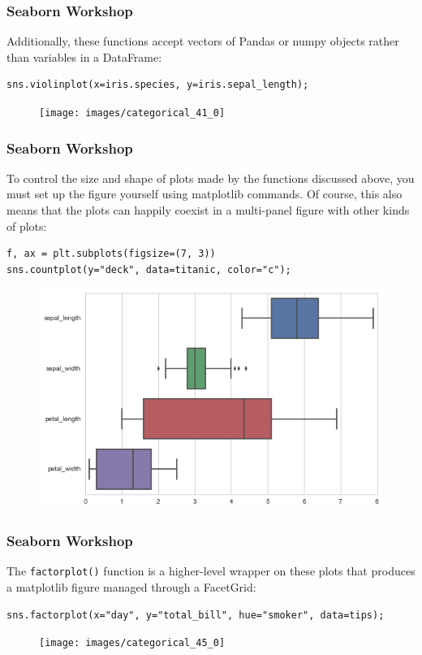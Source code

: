 \documentclass{beamer}
\begin{document}
\begin{frame}[fragile]
	\frametitle{Seaborn Workshop}
	\large
	
Additionally, these functions accept vectors of Pandas or numpy objects rather than variables in a DataFrame:
\begin{verbatim}
sns.violinplot(x=iris.species, y=iris.sepal_length);
\end{verbatim}

\begin{figure}
	\centering
	\texttt{[image: images/categorical\_41\_0]}

\end{figure}
\end{frame}
\begin{frame}[fragile]
	\frametitle{Seaborn Workshop}
	\large
	
To control the size and shape of plots made by the functions discussed above, you must set up the figure yourself using matplotlib commands. Of course, this also means that the plots can happily coexist in a multi-panel figure with other kinds of plots:
\begin{verbatim}
f, ax = plt.subplots(figsize=(7, 3))
sns.countplot(y="deck", data=titanic, color="c");
\end{verbatim}
\begin{figure}
	\centering
	\includegraphics[width=0.7\linewidth]{images/categorical_43_0}
	
\end{figure}
\end{frame}
\begin{frame}[fragile]
	\frametitle{Seaborn Workshop}
	\large
	
The \texttt{factorplot()} function is a higher-level wrapper on these plots that produces a matplotlib figure managed through a FacetGrid:
\begin{verbatim}
sns.factorplot(x="day", y="total_bill", hue="smoker", data=tips);
\end{verbatim}

\begin{figure}
	\centering
	\texttt{[image: images/categorical\_45\_0]}
	
\end{figure}
\end{frame}
\end{document}
